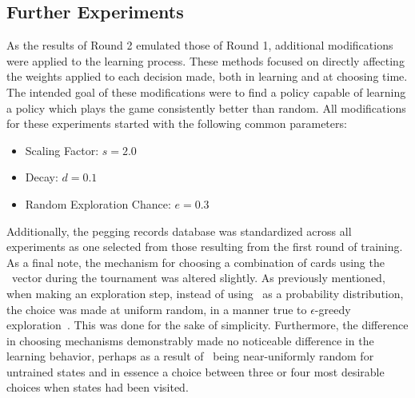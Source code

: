 

\subsection{Further Experiments}
\label{sec:findings-expts}

As the results of Round 2 emulated those of Round 1,
additional modifications were applied to the learning process.
%
These methods focused on directly affecting the weights applied to each
decision made,
both in learning and at choosing time.
%
The intended goal of these modifications were to find a policy
capable of learning a policy which plays the game consistently better than
random.
%
All modifications for these experiments started with the following common
parameters:
\begin{itemize}
	\item Scaling Factor: $s = 2.0$
	\item Decay: $d = 0.1$
	\item Random Exploration Chance: $e = 0.3$
\end{itemize}
%
Additionally,
the pegging records database was standardized across all experiments
as one selected from those resulting from the first round of training.
%
As a final note,
the mechanism for choosing a combination of cards using the \p\ vector 
during the tournament was altered slightly.
%
As previously mentioned,
when making an exploration step,
instead of using \p\ as a probability distribution,
the choice was made at uniform random,
in a manner true to $\epsilon$-greedy exploration~\cite{rl_book}.
%
This was done for the sake of simplicity.
%
Furthermore,
the difference in choosing mechanisms demonstrably
made no noticeable difference in the learning behavior,
perhaps as a result of \p\ being near-uniformly random for untrained states
and in essence a choice between three or four most desirable choices when
states had been visited.

%





%








